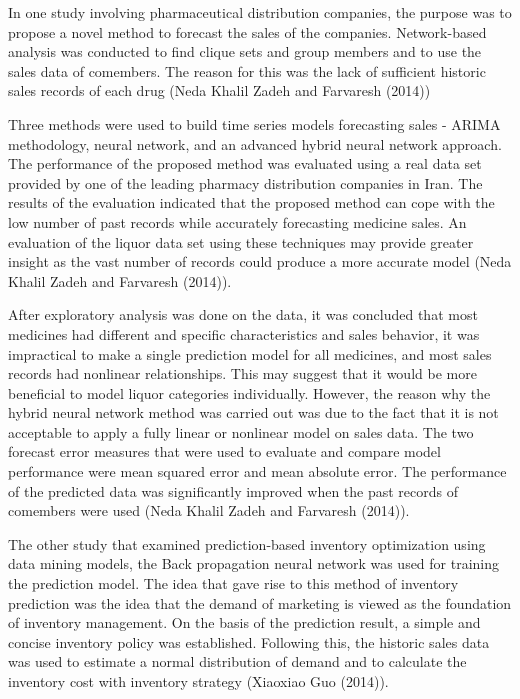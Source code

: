 \documentclass[]{elsarticle} %
\begin{document}
In one study involving pharmaceutical distribution companies, the
purpose was to propose a novel method to forecast the sales of the
companies. Network-based analysis was conducted to find clique sets and
group members and to use the sales data of comembers. The reason for
this was the lack of sufficient historic sales records of each drug
(Neda Khalil Zadeh and Farvaresh (2014))

Three methods were used to build time series models forecasting sales -
ARIMA methodology, neural network, and an advanced hybrid neural network
approach. The performance of the proposed method was evaluated using a
real data set provided by one of the leading pharmacy distribution
companies in Iran. The results of the evaluation indicated that the
proposed method can cope with the low number of past records while
accurately forecasting medicine sales. An evaluation of the liquor data
set using these techniques may provide greater insight as the vast
number of records could produce a more accurate model (Neda Khalil Zadeh
and Farvaresh (2014)).

After exploratory analysis was done on the data, it was concluded that
most medicines had different and specific characteristics and sales
behavior, it was impractical to make a single prediction model for all
medicines, and most sales records had nonlinear relationships. This may
suggest that it would be more beneficial to model liquor categories
individually. However, the reason why the hybrid neural network method
was carried out was due to the fact that it is not acceptable to apply a
fully linear or nonlinear model on sales data. The two forecast error
measures that were used to evaluate and compare model performance were
mean squared error and mean absolute error. The performance of the
predicted data was significantly improved when the past records of
comembers were used (Neda Khalil Zadeh and Farvaresh (2014)).

The other study that examined prediction-based inventory optimization
using data mining models, the Back propagation neural network was used
for training the prediction model. The idea that gave rise to this
method of inventory prediction was the idea that the demand of marketing
is viewed as the foundation of inventory management. On the basis of the
prediction result, a simple and concise inventory policy was
established. Following this, the historic sales data was used to
estimate a normal distribution of demand and to calculate the inventory
cost with inventory strategy (Xiaoxiao Guo (2014)).
\end{document}
